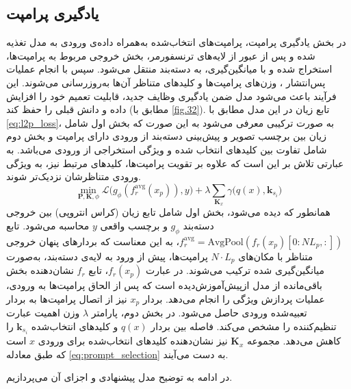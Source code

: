 \subsection{یادگیری پرامپت}
در بخش یادگیری پرامپت، پرامپت‌های انتخاب‌شده به‌همراه داده‌ی ورودی به مدل تغذیه شده و پس از عبور از لایه‌های ترنسفورمر، بخش خروجی مربوط به پرامپت‌ها، استخراج شده و با میانگین‌گیری، به دسته‌بند  منتقل می‌شود. سپس با انجام عملیات پس‌انتشار ، وزن‌های پرامپت‌ها و کلیدهای متناظر آن‌ها به‌روزرسانی می‌شوند. این فرآیند باعث می‌شود مدل ضمن یادگیری وظایف جدید، قابلیت تعمیم خود را افزایش داده و دانش قبلی را حفظ کند (مطابق با \cref{fig.32}). تابع زیان در این مدل مطابق با \eqref{eq:l2p_loss}، به صورت ترکیبی معرفی می‌شود به این صورت که بخش اول شامل زیان بین برچسب تصویر و پیش‌بینی دسته‌بند از ورودی دارای پرامپت و بخش دوم شامل تفاوت بین کلیدهای انتخاب شده و ویژگی استخراجی از ورودی می‌باشد. به عبارتی تلاش بر این است که علاوه بر تقویت پرامپت‌ها، کلیدهای مرتبط نیز، به ویژگی ورودی متناظرشان نزدیک‌‌‌تر شوند. 
\begin{equation}\label{eq:l2p_loss}
	\min_{\mathbf{P}, \mathbf{K}, \phi} 
	\mathcal{L}\big( g_{\phi}( f_r^{\mathrm{avg}} (x_p) ), y \big) 
	+ \lambda \sum_{\mathbf{K}_x} \gamma \big( q(x), \mathbf{k}_{s_i} \big)
\end{equation}
همانطور که دیده می‌شود، بخش اول شامل تابع زیان (کراس انتروپی) بین خروجی دسته‌بند \(g_{\phi}\) و برچسب واقعی \(y\) محاسبه می‌شود. تابع \( f_r^{\mathrm{avg}} = \mathrm{AvgPool}(f_r(x_p)[0 : N L_p, :]) \)، به این معناست که بردارهای پنهان خروجی متناظر با مکان‌های \( N \cdot L_p \) پرامپت‌ها، پیش از ورود به لایه‌ی دسته‌بند، به‌صورت میانگین‌گیری شده ترکیب می‌شوند. 
در عبارت \( f_r(x_p) \)، تابع \( f_r \) نشان‌دهنده بخش باقی‌مانده از مدل ازپیش‌آموزش‌دیده است که پس از الحاق پرامپت‌ها به ورودی، عملیات پردازش ویژگی را انجام می‌دهد. 
بردار \( x_p \) نیز از اتصال پرامپت‌ها به بردار تعبیه‌شده ورودی حاصل می‌شود. در بخش دوم، پارامتر \(\lambda\) وزن اهمیت عبارت تنظیم‌کننده را مشخص می‌کند. فاصله بین بردار \(q(x)\) و کلیدهای انتخاب‌شده \(\mathbf{k}_{s_i}\) را کاهش می‌دهد. مجموعه \(\mathbf{K}_x\) نیز نشان‌دهنده کلیدهای انتخاب‌شده برای ورودی \(x\) است که طبق معادله \eqref{eq:prompt_selection} به دست می‌آیند.

در ادامه به توضیح مدل پیشنهادی و اجزای آن می‌پردازیم. 
